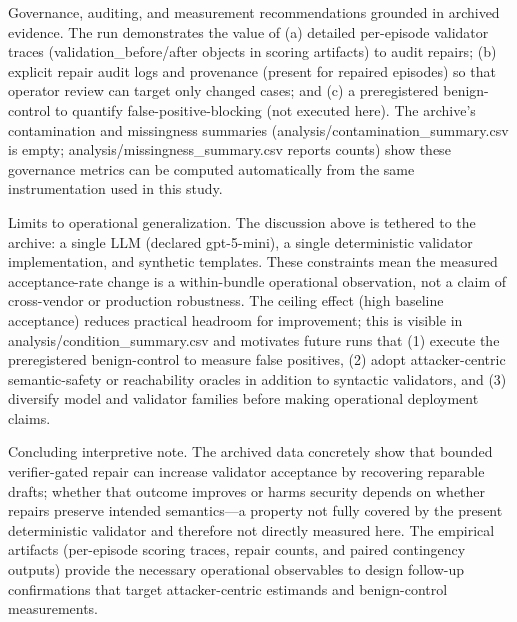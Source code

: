 \documentclass[conference]{IEEEtran}
\begin{document}
Governance, auditing, and measurement recommendations grounded in archived evidence. The run demonstrates the value of (a) detailed per-episode validator traces (validation\_before/after objects in scoring artifacts) to audit repairs; (b) explicit repair audit logs and provenance (present for repaired episodes) so that operator review can target only changed cases; and (c) a preregistered benign-control to quantify false-positive-blocking (not executed here). The archive's contamination and missingness summaries (analysis/contamination\_summary.csv is empty; analysis/missingness\_summary.csv reports counts) show these governance metrics can be computed automatically from the same instrumentation used in this study.

Limits to operational generalization. The discussion above is tethered to the archive: a single LLM (declared gpt-5-mini), a single deterministic validator implementation, and synthetic templates. These constraints mean the measured acceptance-rate change is a within-bundle operational observation, not a claim of cross-vendor or production robustness. The ceiling effect (high baseline acceptance) reduces practical headroom for improvement; this is visible in analysis/condition\_summary.csv and motivates future runs that (1) execute the preregistered benign-control to measure false positives, (2) adopt attacker-centric semantic-safety or reachability oracles in addition to syntactic validators, and (3) diversify model and validator families before making operational deployment claims.

Concluding interpretive note. The archived data concretely show that bounded verifier-gated repair can increase validator acceptance by recovering reparable drafts; whether that outcome improves or harms security depends on whether repairs preserve intended semantics---a property not fully covered by the present deterministic validator and therefore not directly measured here. The empirical artifacts (per-episode scoring traces, repair counts, and paired contingency outputs) provide the necessary operational observables to design follow-up confirmations that target attacker-centric estimands and benign-control measurements.
\end{document}
